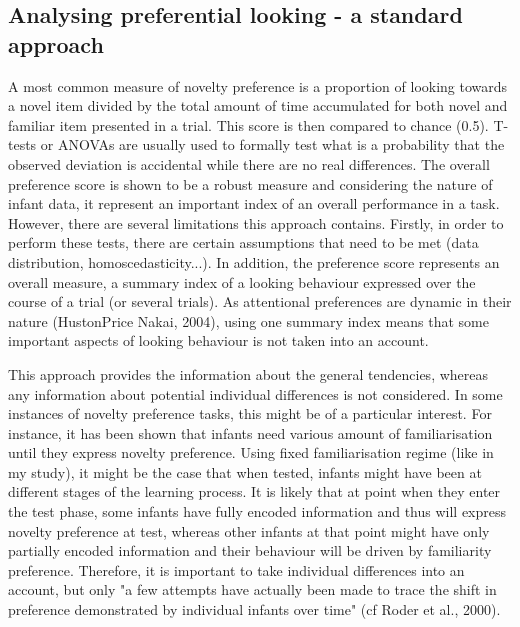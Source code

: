 \documentclass[a4paper,man,natbib]{apa6}
\begin{document}
\subsection{Analysing preferential looking - a standard approach}
A most common measure of novelty preference is a proportion of looking towards a novel item divided by the total amount of time accumulated for both novel and familiar item presented in a trial. This score is then compared to chance (0.5). T-tests or ANOVAs are usually used to formally test what is a probability that the observed deviation is accidental while there are no real differences.
The overall preference score is shown to be a robust measure and considering the nature of infant data, it represent an important index of an overall performance in a task. However, there are several limitations this approach contains. Firstly, in order to perform these tests, there are certain assumptions that need to be met (data distribution, homoscedasticity...). In addition, the preference score represents an overall measure, a summary index of a looking behaviour expressed over the course of a trial (or several trials). As attentional preferences are dynamic in their nature (HustonPrice Nakai, 2004), using one summary index means that some important aspects of looking behaviour is not taken into an account.

This approach provides the information about the general tendencies, whereas any information about potential individual differences is not considered. In some instances of novelty preference tasks, this might be of a particular interest. For instance, it has been shown that infants need various amount of familiarisation until they express novelty preference. Using fixed familiarisation regime (like in my study), it might be the case that when tested, infants might have been at different stages of the learning process. It is likely that at point when they enter the test phase, some infants have fully encoded information and thus will express novelty preference at test, whereas other infants at that point might have only partially encoded information and their behaviour will be driven by familiarity preference.  Therefore, it is important to take individual differences into an account, but only "a few attempts have actually been made to trace the shift in preference demonstrated by individual infants over time" (cf Roder et al., 2000).



\end{document}
